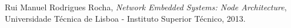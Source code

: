 \begin{thebibliography}{9}

   Rui Manuel Rodrigues Rocha,
   \emph{Network Embedded Systems: Node Architecture},
   Universidade Técnica de Lisboa - Instituto Superior Técnico,
   2013.

\end{thebibliography}
